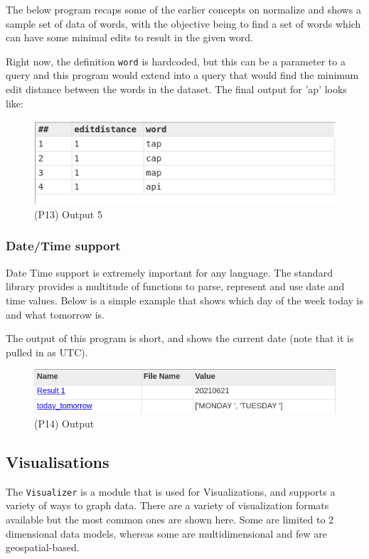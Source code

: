 \documentclass[a4paper,oneside,12pt]{book}
\begin{document}
The below program recaps some of the earlier concepts on normalize and shows a sample set of data of words, with the objective being to find a set of words which can have some minimal edits to result in the given word.

Right now, the definition \lstinline{word} is hardcoded, but this can be a parameter to a query and this program would extend into a query that would find the minimum edit distance between the words in the dataset.
The final output for 'ap' looks like:

\begin{figure}[h]
    \centering
    \includegraphics[width=.6\linewidth]{../output/77/5}
    \caption{(P13) Output 5}
\end{figure}

\subsubsection{Date/Time support}

Date Time support is extremely important for any language. The standard library provides a multitude of functions to parse, represent and use date and time values.
Below is a simple example that shows which day of the week today is and what tomorrow is.




The output of this program is short, and shows the current date (note that it is pulled in as UTC).

\begin{figure}[h]
    \centering
    \includegraphics[width=.6\linewidth]{../output/78/1}
    \caption{(P14) Output}
\end{figure}




\subsection{Visualisations}

The \lstinline!Visualizer! is a module that is used for Visualizations, and supports a variety of ways to graph data. There are a variety of visualization formats available but the most common ones are shown here. Some are limited to 2 dimensional data models, whereas some are multidimensional and few are geospatial-based.
\end{document}

